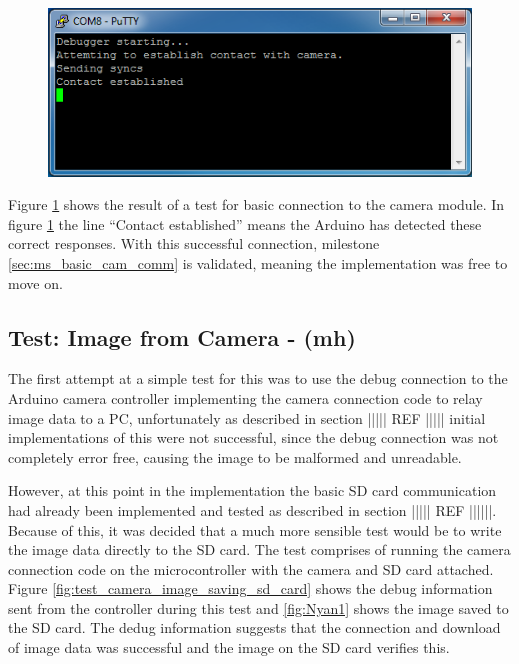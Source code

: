 \begin{figure}[H]
        \centering
        \includegraphics[width=1.0\textwidth]{testing_screenshots/camera_basic_connection_test.png}
        \label{fig:test_basic_connection}
\end{figure}

Figure \ref{fig:test_basic_connection} shows the result of a test for basic connection to the camera module. In figure \ref{fig:test_basic_connection} the line ``Contact established'' means the Arduino has detected these correct responses. With this successful connection, milestone \ref{sec:ms_basic_cam_comm} is validated, meaning the implementation was free to move on.

\subsection{Test: Image from Camera - (mh)}
\label{sec:image_capture_test}

The first attempt at a simple test for this was to use the debug connection to the Arduino camera controller implementing the camera connection code to relay image data to a PC, unfortunately as described in section ||||| REF ||||| initial implementations of this were not successful, since the debug connection was not completely error free, causing the image to be malformed and unreadable.

However, at this point in the implementation the basic SD card communication had already been implemented and tested as described in section ||||| REF ||||||. Because of this, it was decided  that a much more sensible test would be to write the image data directly to the SD card. The test comprises of running the camera connection code on the microcontroller with the camera and SD card attached. Figure \ref{fig:test_camera_image_saving_sd_card} shows the debug information sent from the controller during this test and \ref{fig:Nyan1} shows the image saved to the SD card. The dedug information suggests that the connection and download of image data was successful and the image on the SD card verifies this.

